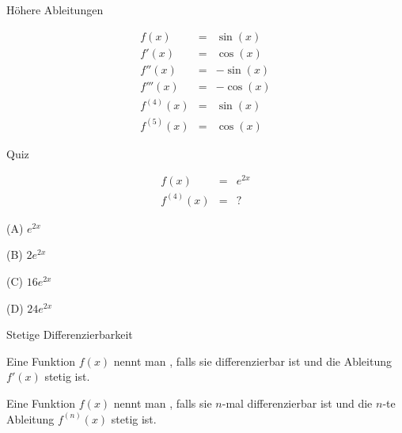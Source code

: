 \documentclass[german]{beamer}
\newcommand{\bq}{\begin{eqnarray*}}
\newcommand{\eq}{\end{eqnarray*}}
\newcommand{\superalert}[1]{{\color{MyYellowOrange}{#1}}}
\begin{document}
\begin{frame}{H\"ohere Ableitungen}

\begin{example}
\bq
 f\left(x\right) & = & \sin\left(x\right)
 \nonumber \\
 f'\left(x\right) & = & \cos\left(x\right)
 \nonumber \\
 f''\left(x\right) & = & -\sin\left(x\right)
 \nonumber \\
 f'''\left(x\right) & = & -\cos\left(x\right)
 \nonumber \\
 f^{(4)}\left(x\right) & = & \sin\left(x\right)
 \nonumber \\
 f^{(5)}\left(x\right) & = & \cos\left(x\right)
\eq
\end{example}

\end{frame}

\begin{frame}{Quiz}

\bq
 f\left(x\right) & = & e^{2x}
 \nonumber \\
 f^{(4)}\left(x\right) & = & ?
\eq
\begin{description}
\item{(A)} $e^{2x}$
\item{(B)} $2 e^{2x}$
\item{(C)} $16 e^{2x}$
\item{(D)} $24 e^{2x}$
\end{description}

\end{frame}

\begin{frame}{Stetige Differenzierbarkeit}

\begin{definition}
Eine Funktion $f(x)$ nennt man \superalert{stetig differenzierbar}, falls sie differenzierbar ist und die Ableitung $f'(x)$ stetig ist.
\end{definition}
\begin{definition}
Eine Funktion $f(x)$ nennt man \superalert{$n$-mal stetig differenzierbar}, falls sie $n$-mal differenzierbar ist und die $n$-te 
Ableitung $f^{(n)}(x)$ stetig ist.
\end{definition}

\end{frame}
\end{document}
